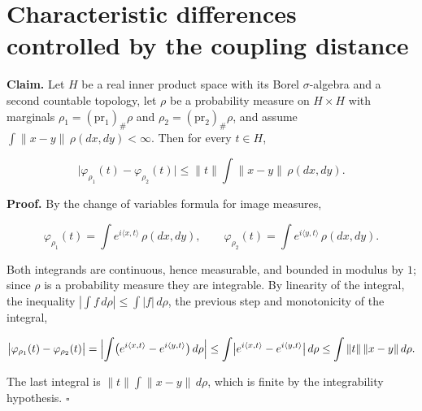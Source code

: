 \documentclass[11pt,a4paper]{article}
\begin{document}
\section{\texorpdfstring{Characteristic differences controlled by the coupling distance}{Characteristic differences controlled by the coupling distance}}


\textbf{Claim.} Let \(H\) be a real inner product space with its Borel \(\sigma\)-algebra and a second countable topology, let \(\rho\) be a probability measure on \(H\times H\) with marginals \(\rho_1=(\mathrm{pr}_1)_\#\rho\) and \(\rho_2=(\mathrm{pr}_2)_\#\rho\), and assume \(\int\|x-y\|\,\rho(dx,dy)<\infty\). Then for every \(t\in H\),


\[\bigl|\varphi_{\rho_1}(t)-\varphi_{\rho_2}(t)\bigr|\le\|t\|\int\|x-y\|\,\rho(dx,dy).\]


\textbf{Proof.} By the change of variables formula for image measures,


\[\varphi_{\rho_1}(t)=\int e^{i\langle x,t\rangle}\,\rho(dx,dy),\qquad\varphi_{\rho_2}(t)=\int e^{i\langle y,t\rangle}\,\rho(dx,dy).\]


Both integrands are continuous, hence measurable, and bounded in modulus by \(1\); since \(\rho\) is a probability measure they are integrable. By linearity of the integral, the inequality \(|\int f\,d\rho|\le\int|f|\,d\rho\), the previous step and monotonicity of the integral,


\[\bigl|\varphi_{\rho_1}(t)-\varphi_{\rho_2}(t)\bigr|=\Bigl|\int\bigl(e^{i\langle x,t\rangle}-e^{i\langle y,t\rangle}\bigr)\,d\rho\Bigr|\le\int\bigl|e^{i\langle x,t\rangle}-e^{i\langle y,t\rangle}\bigr|\,d\rho\le\int\|t\|\,\|x-y\|\,d\rho .\]


The last integral is \(\|t\|\int\|x-y\|\,d\rho\), which is finite by the integrability hypothesis. \(\square\)
\end{document}
